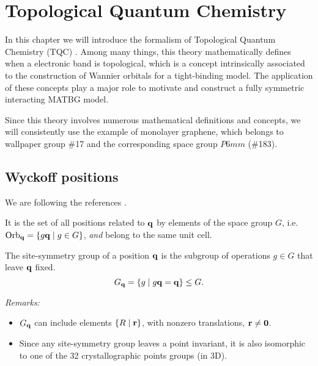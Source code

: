 



\chapter{Topological Quantum Chemistry}

In this chapter we will introduce the formalism of Topological Quantum Chemistry (TQC) \cite{topological_quantum_chemistry2017}. Among many things, this theory mathematically defines when a electronic band is topological, which is a concept intrinsically associated to the construction of Wannier orbitals for a tight-binding model. The application of these concepts play a major role to motivate and construct a fully symmetric interacting MATBG model.

Since this theory involves numerous mathematical definitions and concepts, we will consistently use the example of monolayer graphene, which belongs to wallpaper group \#17 and the corresponding space group $P6mm$ (\#183).

\section{Wyckoff positions}

We are following the references \cite{lectures_tms2017, building_blocks2018}.

\begin{definition}[Orbit of $\q$] \label{def:orbit_q}
It is the set of all positions related to $\q$ by elements of the space group $G$, i.e. $\text{Orb}_{\vb{q}} = \{g {\vb{q}} \mid g \in G\}$, \textit{and} belong to the same unit cell.
\end{definition}

\begin{definition} \label{def:sitesym}
The site-symmetry group of a position $\q$ is the subgroup of operations $g \in G$ that leave $\q$ fixed.
$$
G_{\vb{q}} = \{g \mid g {\vb{q}} = {\vb{q}}\} \leq G.
$$
\end{definition}

\textit{Remarks:}
\begin{itemize}
\item $G_{\vb{q}}$ can include elements $\{R \mid {\vb{r}}\}$, with nonzero translations, ${\vb{r}} \neq {\vb{0}}$.
\item Since any site-symmetry group leaves a point invariant, it is also isomorphic to one of the 32 crystallographic points groups (in 3D).
\end{itemize}

